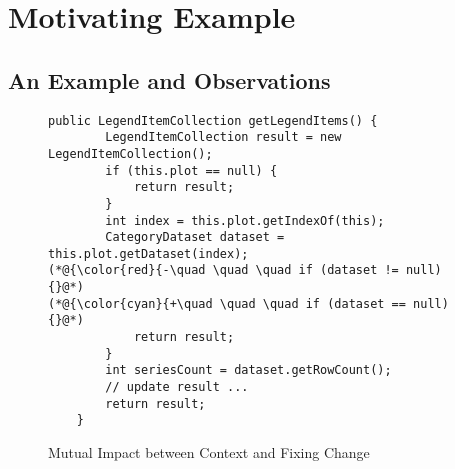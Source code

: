 \section{Motivating Example}
\label{motiv:sec}

\subsection{An Example and Observations}

\begin{figure}[t]
	\centering
	\begin{lstlisting}[]
    public LegendItemCollection getLegendItems() {
        LegendItemCollection result = new LegendItemCollection();
        if (this.plot == null) {
            return result;
        }
        int index = this.plot.getIndexOf(this);
        CategoryDataset dataset = this.plot.getDataset(index);
(*@{\color{red}{-\quad \quad \quad if (dataset != null) {}@*)
(*@{\color{cyan}{+\quad \quad \quad if (dataset == null) {}@*)
            return result;
        }
        int seriesCount = dataset.getRowCount();
        // update result ...
        return result;
    }
	\end{lstlisting}
        \vspace{-15pt}
        \caption{Mutual Impact between Context and Fixing Change}
        \vspace{-8pt}
        \label{fig:motiv}
\end{figure}


